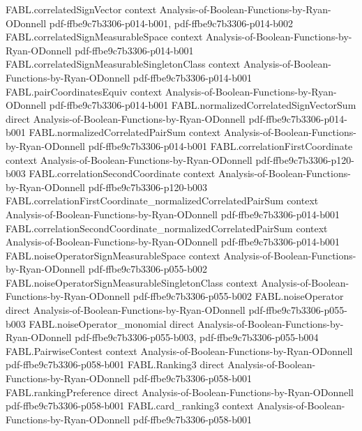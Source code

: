 \begin{theorem}
\proofstep
  {FABL.correlatedSignVector}
  {context}
  {Analysis-of-Boolean-Functions-by-Ryan-ODonnell}
  {pdf-ffbe9c7b3306-p014-b001,
    pdf-ffbe9c7b3306-p014-b002}
\proofstep
  {FABL.correlatedSignMeasurableSpace}
  {context}
  {Analysis-of-Boolean-Functions-by-Ryan-ODonnell}
  {pdf-ffbe9c7b3306-p014-b001}
\proofstep
  {FABL.correlatedSignMeasurableSingletonClass}
  {context}
  {Analysis-of-Boolean-Functions-by-Ryan-ODonnell}
  {pdf-ffbe9c7b3306-p014-b001}
\proofstep
  {FABL.pairCoordinatesEquiv}
  {context}
  {Analysis-of-Boolean-Functions-by-Ryan-ODonnell}
  {pdf-ffbe9c7b3306-p014-b001}
\proofstep
  {FABL.normalizedCorrelatedSignVectorSum}
  {direct}
  {Analysis-of-Boolean-Functions-by-Ryan-ODonnell}
  {pdf-ffbe9c7b3306-p014-b001}
\proofstep
  {FABL.normalizedCorrelatedPairSum}
  {context}
  {Analysis-of-Boolean-Functions-by-Ryan-ODonnell}
  {pdf-ffbe9c7b3306-p014-b001}
\proofstep
  {FABL.correlationFirstCoordinate}
  {context}
  {Analysis-of-Boolean-Functions-by-Ryan-ODonnell}
  {pdf-ffbe9c7b3306-p120-b003}
\proofstep
  {FABL.correlationSecondCoordinate}
  {context}
  {Analysis-of-Boolean-Functions-by-Ryan-ODonnell}
  {pdf-ffbe9c7b3306-p120-b003}
\proofstep
  {FABL.correlationFirstCoordinate_normalizedCorrelatedPairSum}
  {context}
  {Analysis-of-Boolean-Functions-by-Ryan-ODonnell}
  {pdf-ffbe9c7b3306-p014-b001}
\proofstep
  {FABL.correlationSecondCoordinate_normalizedCorrelatedPairSum}
  {context}
  {Analysis-of-Boolean-Functions-by-Ryan-ODonnell}
  {pdf-ffbe9c7b3306-p014-b001}
\proofstep
  {FABL.noiseOperatorSignMeasurableSpace}
  {context}
  {Analysis-of-Boolean-Functions-by-Ryan-ODonnell}
  {pdf-ffbe9c7b3306-p055-b002}
\proofstep
  {FABL.noiseOperatorSignMeasurableSingletonClass}
  {context}
  {Analysis-of-Boolean-Functions-by-Ryan-ODonnell}
  {pdf-ffbe9c7b3306-p055-b002}
\proofstep
  {FABL.noiseOperator}
  {direct}
  {Analysis-of-Boolean-Functions-by-Ryan-ODonnell}
  {pdf-ffbe9c7b3306-p055-b003}
\proofstep
  {FABL.noiseOperator_monomial}
  {direct}
  {Analysis-of-Boolean-Functions-by-Ryan-ODonnell}
  {pdf-ffbe9c7b3306-p055-b003,
    pdf-ffbe9c7b3306-p055-b004}
\proofstep
  {FABL.PairwiseContest}
  {context}
  {Analysis-of-Boolean-Functions-by-Ryan-ODonnell}
  {pdf-ffbe9c7b3306-p058-b001}
\proofstep
  {FABL.Ranking3}
  {direct}
  {Analysis-of-Boolean-Functions-by-Ryan-ODonnell}
  {pdf-ffbe9c7b3306-p058-b001}
\proofstep
  {FABL.rankingPreference}
  {direct}
  {Analysis-of-Boolean-Functions-by-Ryan-ODonnell}
  {pdf-ffbe9c7b3306-p058-b001}
\proofstep
  {FABL.card_ranking3}
  {context}
  {Analysis-of-Boolean-Functions-by-Ryan-ODonnell}
  {pdf-ffbe9c7b3306-p058-b001}

\end{theorem}
